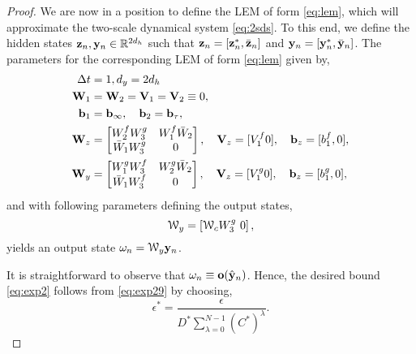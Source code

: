 \documentclass{article} \usepackage{iclr2022_conference,times}
\newcommand{\by}{{\bf y}}
\newcommand{\bz}{{\bf z}}
\newcommand{\bW}{{\bf W}}
\newcommand{\bb}{{\bf b}}
\newcommand{\bV}{{\bf V}}
\newcommand{\bo}{{\bf o}}
\newcommand{\R}{{\mathbb R}}
\newcommand{\Dt}{{\Delta t}}
\newcommand{\cW}{\EuScript{W}}
\begin{document}
\begin{proof}
We are now in a position to define the LEM of form \eqref{eq:lem}, which will approximate the two-scale dynamical system \eqref{eq:2sds}. To this end, we define the hidden states $\bz_n,\by_n \in \R^{2d_h}$ such that $\bz_n = [\bz_n^{\ast},\bar{\bz}_n]$ and $\by_n = [\by_n^{\ast},\bar{\by}_n]$. The parameters for the corresponding LEM of form \eqref{eq:lem} given by,
\begin{equation}
    \label{eq:exp214}
    \begin{aligned}
    \Dt &= 1, d_y = 2d_h\\
    \bW_1 &= \bW_2 = \bV_1 = \bV_2 \equiv 0, \\
    \bb_1 &= \bb_{\infty}, \quad \bb_2 = \bb_{\tau}, \\
    \bW_z &=\begin{bmatrix}
    W^f_2W^g_3 & W^f_1\bar{W}_2 \\
    \bar{W}_1W^g_3 & 0 
    \end{bmatrix}, \quad \bV_z = [V^f_1 0], \quad \bb_z = [b^f_1,0], \\
    \bW_y &=\begin{bmatrix}
    W^g_1W^f_3 & W^g_2\bar{W}_2 \\
    \bar{W}_1W^f_3 & 0 
    \end{bmatrix}, \quad \bV_z = [V^g_1 0], \quad \bb_z = [b^g_1,0], \\
    \end{aligned}
\end{equation}
and with following parameters defining the output states,
\begin{equation}
    \label{eq:exp216}
     \cW_y = \left[\cW_c W^g_3 ~0 \right], 
\end{equation}
yields an output state $\omega_n = \cW_y \by_n$.  

It is straightforward to observe that $\omega_n \equiv \bo(\hat{\by}_n)$. Hence, the desired bound \eqref{eq:exp2} follows from \eqref{eq:exp29} by choosing,
$$
\epsilon^{\ast} = \frac{\epsilon}{D^{\ast}\sum\limits_{\lambda=0}^{N-1}(C^{\ast})^{\lambda}}.
$$

\end{proof}
\end{document}
